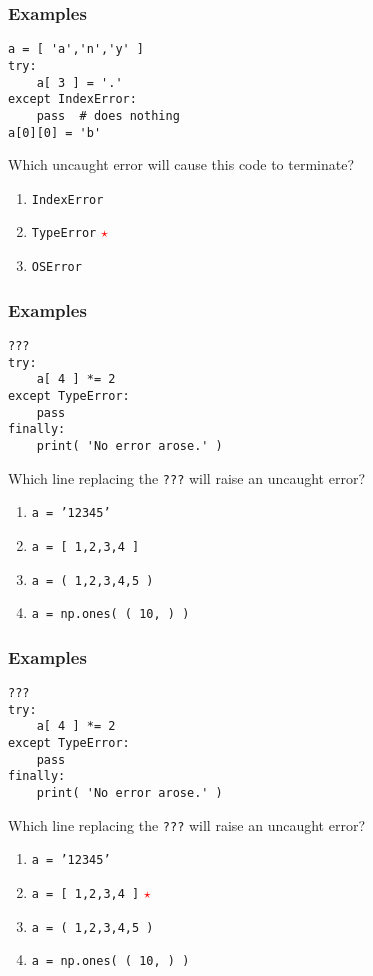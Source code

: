\documentclass[11pt]{beamer}
\newcommand{\correctstar}{{\Large\textcolor{red}{$\star$}}}
\begin{document}
\begin{frame}[fragile]
  \frametitle{Examples}
  \Enlarge

  \begin{Verbatim}
a = [ 'a','n','y' ]
try:
    a[ 3 ] = '.'
except IndexError:
    pass  # does nothing
a[0][0] = 'b'
  \end{Verbatim}

  Which uncaught error will cause this code to terminate?

  \begin{enumerate}[label=\Alph*]
    \item  \texttt{IndexError}
    \item  \texttt{TypeError}  \correctstar
    \item  \texttt{OSError}
  \end{enumerate}
\end{frame}

\begin{frame}[fragile]
  \frametitle{Examples}
  \Enlarge

  \begin{Verbatim}
???
try:
    a[ 4 ] *= 2
except TypeError:
    pass
finally:
    print( 'No error arose.' )
  \end{Verbatim}

  Which line replacing the \texttt{???} will raise an uncaught error?

  \begin{enumerate}[label=\Alph*]
    \item  \texttt{a = '12345'}
    \item  \texttt{a = [ 1,2,3,4 ]}
    \item  \texttt{a = ( 1,2,3,4,5 )}
    \item  \texttt{a = np.ones( ( 10, ) )}
  \end{enumerate}
\end{frame}

\begin{frame}[fragile]
  \frametitle{Examples}
  \Enlarge

  \begin{Verbatim}
???
try:
    a[ 4 ] *= 2
except TypeError:
    pass
finally:
    print( 'No error arose.' )
  \end{Verbatim}

  Which line replacing the \texttt{???} will raise an uncaught error?

  \begin{enumerate}[label=\Alph*]
    \item  \texttt{a = '12345'}
    \item  \texttt{a = [ 1,2,3,4 ]}  \correctstar
    \item  \texttt{a = ( 1,2,3,4,5 )}
    \item  \texttt{a = np.ones( ( 10, ) )}
  \end{enumerate}
\end{frame}
\end{document}

